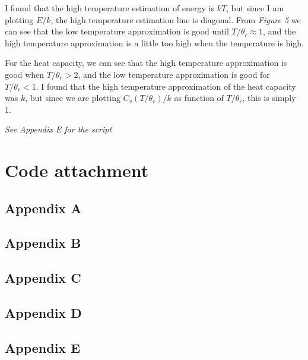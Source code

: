 \documentclass{scrartcl}
\begin{document}
I found that the high temperature estimation of energy is $kT$, but since I am plotting $E/k$, the high temperature estimation line is diagonal. From \textit{Figure 5} we can see that the low temperature approximation is good until $T/\theta_r\approx 1$, and the high temperature approximation is a little too high when the temperature is high.\par\vspace{3mm}
For the heat capacity, we can see that the high temperature approximation is good when $T/\theta_r>2$, and the low temperature approximation is good for $T/\theta_r<1$. I found that the high temperature approximation of the heat capacity was $k$, but since we are plotting $C_v(T/\theta_r)/k$ as function of $T/\theta_r$, this is simply 1.\par\vspace{3mm}
\textit{See Appendix E for the script}

\newpage
\section*{Code attachment}
\subsection*{Appendix A}


\subsection*{Appendix B}


\subsection*{Appendix C}


\subsection*{Appendix D}


\subsection*{Appendix E}

\end{document}
